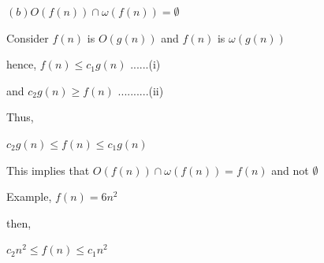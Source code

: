 \documentclass[letterpaper,portrait,12pt]{article}
\begin{document}
\begin{flushleft}
$(b) O(f (n)) \cap \omega(f (n)) = \emptyset$
\end{flushleft}


\begin{flushleft}

\end{flushleft}


\begin{flushleft}
Consider $f(n) $ is $O(g(n))$ and $f(n) $ is $\omega(g(n))$
\end{flushleft}


\begin{flushleft}
hence, $f(n) \le c_1g(n)$ ......(i)
\end{flushleft}


\begin{flushleft}
and $c_2g(n) \ge f(n)$ ..........(ii) 
\end{flushleft}


\begin{flushleft}

\end{flushleft}


\begin{flushleft}
Thus,
\end{flushleft}


\begin{flushleft}
$c_2g(n)\le f(n) \le c_1g(n)$
\end{flushleft}


\begin{flushleft}

\end{flushleft}


\begin{flushleft}
This implies that $O(f (n)) \cap \omega(f (n)) =$$f(n)$ and not $\emptyset$
\end{flushleft}


\begin{flushleft}

\end{flushleft}


\begin{flushleft}
Example, $f(n)= 6n^2$
\end{flushleft}


\begin{flushleft}
then,
\end{flushleft}


\begin{flushleft}
$c_2n^2\le f(n) \le c_1n^2$
\end{flushleft}
\end{document}
